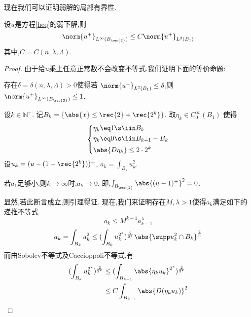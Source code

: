 现在我们可以证明弱解的局部有界性.
\begin{lemma}[局部有界性]
    设$u$是方程\eqref{heq}的弱下解,则
    \begin{equation}
        \norm{u^+}_{L^\infty(B_\rec{2})} \le C\norm{u^+}_{L^2(B_1)}
    \end{equation}
    其中,$C=C(n,\lambda,\Lambda)$.
\end{lemma}
\begin{proof}
    由于给$u$乘上任意正常数不会改变不等式.我们证明下面的等价命题:
    \begin{proposition*}
        存在$\delta = \delta(n,\lambda,\Lambda)>0$使得若 $\norm{u^+}_{L^2(B_1)} \le \delta$,则$\norm{u^+}_{L^\infty(B_\rec{2})} \le 1$. 
    \end{proposition*}
    设$k  \in \mathbb{N}^+$. 记$B_k=\{\abs{x} \le \rec{2}+\rec{2^k}\}$. 取$\eta_k \in C^\infty_0(B_1)$ 使得
    \begin{equation}
        \left\{
            \begin{aligned}
                &\eta_k\eq 1 \s \iin B_k \\
                &\eta_k \eq 0 \s \iin B_{k-1}-B_k\\
                &\abs{D\eta_k} \le {2}\cdot {2^k}
            \end{aligned}
        \right.
    \end{equation}
    设$u_k=(u-(1-\rec{2^k}))^+$, $a_k=\int_{B_k}u_k^2$.
    \begin{claim}
        若$a_1$足够小,则$k \to \infty$时,$a_k \to 0$. 即,$\int_{B_\rec{2}}\abs{(u-1)^+}^2 =0$.
    \end{claim}
    显然,若此断言成立,则引理得证. 现在,我们来证明存在$M,\lambda >1$使得$a_k$满足如下的递推不等式
    \begin{equation} \label{iter_eq}
        a_k \le M^{k-1}a^\lambda_{k-1}
    \end{equation}
    \begin{equation}
        a_k=\int_{B_k}u^2_k \le (\int_{B_k}u_k^{2^*})^\frac{2}{2^*} \abs{\supp u^2_k \cap B_k}^\frac{2}{n}
    \end{equation}
    而由Sobolev不等式及Caccioppoli不等式,有 
    \begin{equation}
        \begin{split}
            (\int_{B_k}u_k^{2^*})^\frac{2}{2^*}
            &\le (\int_{B_{k-1}}\abs{\eta_k u_k}^{2^*})^\frac{2}{2^*}\\
            &\le C\int_{B_{k-1}}\abs{D(\eta_k u_k)}^2\\

\end{split}
\end{equation}
\end{proof}
